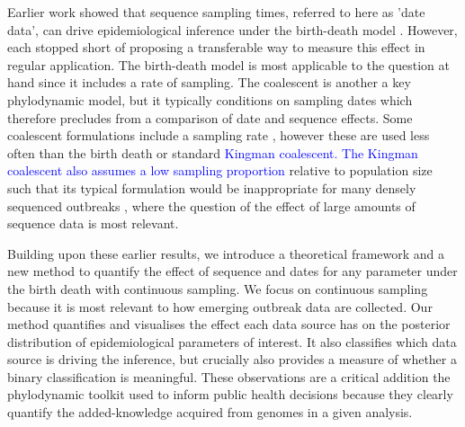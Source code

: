\documentclass{article}
\begin{document}
Earlier work showed that sequence sampling times, referred to here as 'date data', can drive epidemiological inference under the birth-death model \citep{volz_sampling_2014, boskova2018influence, Featherstone2021Infectious}. However, each stopped short of proposing a transferable way to measure this effect in regular application. The birth-death model is most applicable to the question at hand since it includes a rate of sampling. The coalescent is another a key phylodynamic model, but it typically conditions on sampling dates which therefore precludes from a comparison of date and sequence effects. Some coalescent formulations include a sampling rate \citep{volz_sampling_2014}, however these are used less often than the birth death or standard \textcolor{blue}{Kingman coalescent. The Kingman coalescent also assumes a low sampling proportion} relative to population size such that its typical formulation would be inappropriate for many densely sequenced outbreaks \citep{boskova2018influence}, where the question of the effect of large amounts of sequence data is most relevant.

Building upon these earlier results, we introduce a theoretical framework and a new method to quantify the effect of sequence and dates for any parameter under the birth death with continuous sampling. We focus on continuous sampling because it is most relevant to how emerging outbreak data are collected. Our method quantifies and visualises the effect each data source has on the posterior distribution of epidemiological parameters of interest. It also classifies which data source is driving the inference, but crucially also provides a measure of  whether  a binary classification is meaningful. These observations are a critical addition the phylodynamic toolkit used to inform public health decisions because they clearly quantify the added-knowledge acquired from genomes in a given analysis.

\end{document}
